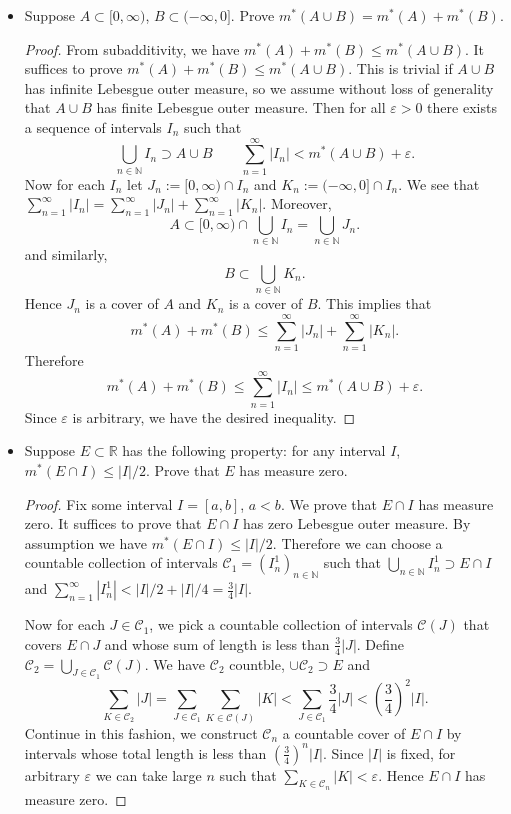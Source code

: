 
\begin{itemize}
	\item Suppose $A \subset [0,\infty )$, $B \subset (-\infty , 0]$. Prove $m^*(A \cup B) = m^*(A) + m^*(B)$.
\begin{proof}
	From subadditivity, we have $m^*(A) + m^*(B) \le  m^*(A \cup B)$.
		It suffices to prove $m^*(A) + m^*(B) \le  m^*(A \cup B)$. This is trivial if $A \cup B$ has infinite Lebesgue outer measure, so we assume without loss of generality that $A \cup B$ has finite Lebesgue outer measure. Then for all $\varepsilon>0$ there exists a sequence of intervals $I_n$ such that 
		\[
			\bigcup_{n \in \mathbb{N}} I_n \supset A \cup B \qquad
			\sum_{n=1}^{\infty} |I_n| < m^*(A \cup B) + \varepsilon
		.\] 
		Now for each $I_n$ let $J_n := [0,\infty ) \cap I_n$ and $K_n := (-\infty , 0] \cap I_n$. We see that $\sum_{n=1}^{\infty} |I_n| = \sum_{n=1}^{\infty} |J_n| + \sum_{n=1}^{\infty} |K_n|$. Moreover, 
		\[
			A \subset [0,\infty ) \cap \bigcup_{n \in \mathbb{N}} I_n = \bigcup_{n \in \mathbb{N}} J_n
		.\] 
		and similarly,
		\[
			B \subset \bigcup_{n \in \mathbb{N}}K_n 
		.\] 
		Hence $J_n$ is a cover of $A$ and $K_n$ is a cover of $B$. This implies that
		\[
			m^*(A) + m^*(B) \le \sum_{n=1}^{\infty} |J_n| + \sum_{n=1}^{\infty} |K_n|
		.\] 
		Therefore
		\[
			m^*(A) + m^*(B) \le  \sum_{n=1}^{\infty} |I_n| \le m^*(A \cup B) + \varepsilon
		.\] 
		Since $ \varepsilon$ is arbitrary, we have the desired inequality.
\end{proof}
\item Suppose $E \subset \mathbb{R}$ has the following property: for any interval $I$, $m^*(E \cap I) \le |I| / 2$. Prove that $E$ has measure zero.
\begin{proof}
	Fix some interval $I = [a,b]$, $a < b$. We prove that $E \cap I$ has measure zero. It suffices to prove that $E \cap I$ has zero Lebesgue outer measure. By assumption we have $m^*(E \cap I) \le |I| / 2$. Therefore we can choose a countable collection of intervals $\mathcal{C}_1 = (I^1_n)_{n \in \mathbb{N}}$ such that $\bigcup_{n \in \mathbb{N}} I^1_n \supset E \cap I$ and $\sum_{n=1}^{\infty} |I^1_n| < |I| / 2 + |I| / 4 = \frac{3}{4} |I|$. 

	Now for each $J \in \mathcal{C}_1$, we pick a countable collection of intervals $\mathcal{C}(J)$ that covers $E \cap J$ and whose sum of length is less than $\frac{3}{4} |J|$. Define $\mathcal{C}_2 = \bigcup_{J \in \mathcal{C}_1} \mathcal{C}(J)$. We have $\mathcal{C}_2$ countble, $\cup \mathcal{C}_2 \supset E$ and
	\[
		\sum_{K \in \mathcal{C}_2} |J| =
		\sum_{J \in \mathcal{C}_1} \sum_{K \in \mathcal{C}(J)} |K| <
		\sum_{J \in \mathcal{C}_1} \frac{3}{4} |J| <
		\left( \frac{3}{4} \right) ^2 |I|
	.\] 
	Continue in this fashion, we construct $\mathcal{C}_n$ a countable cover of $E \cap I$ by intervals whose total length is less than $\left( \frac{3}{4} \right) ^n |I|$. Since $|I|$ is fixed, for arbitrary $\varepsilon$ we can take large $n$ such that $\sum_{K \in \mathcal{C}_n} |K| < \varepsilon$. Hence $E \cap I$ has measure zero.


\end{proof}
\end{itemize}

